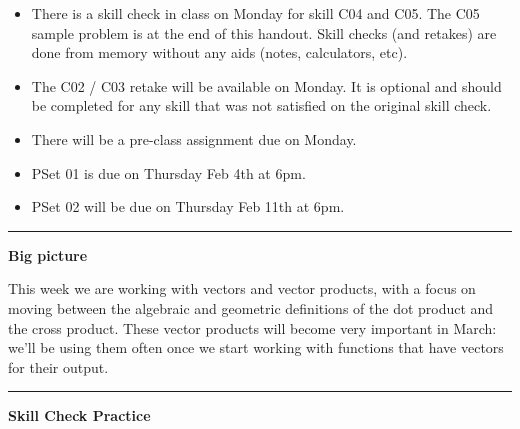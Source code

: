 \documentclass[12pt,letterpaper,noanswers]{exam}
\begin{document}
 \pdfpageheight 11in 
  \pdfpagewidth 8.5in



\begin{itemize}
\itemsep0em
    \item There is a skill check in class on Monday for skill C04 and C05.  The C05 sample problem is at the end of this handout.  Skill checks (and retakes) are done from memory without any aids (notes, calculators, etc).
    \item The C02 / C03 retake will be available on Monday.  It is optional and should be completed for any skill that was not satisfied on the original skill check.
    \item There will be a pre-class assignment due on Monday.
    \item PSet 01 is due on Thursday Feb 4th at 6pm.
    \item PSet 02 will be due on Thursday Feb 11th at 6pm.
\end{itemize}

\hrule
\vspace{0.2cm}



\noindent\textbf{Big picture}

This week we are working with vectors and vector products, with a focus on moving between the algebraic and geometric definitions of the dot product and the cross product.  These vector products will become very important in March: we'll be using them often once we start working with functions that have vectors for their output.
\vspace{0.2cm}
\hrule
\vspace{0.2cm}


\noindent\textbf{Skill Check Practice}
\end{document}
